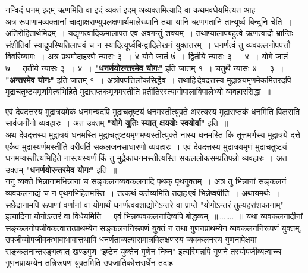 \documentclass[11pt, openany]{book}
\begin{document}
\vspace{-3mm}
 नन्विदं धनम् इदम् ऋणमिति वा इदं व्यक्तं इदम् अव्यक्तमित्यादि 
वा कथमवधेयमित्यत आह\textendash \\

\vspace{-3mm}
 अत्र रूपाणामव्यक्तानां चाद्याक्षराण्युपलक्षणार्थमालेख्यानि तथा यानि 
ऋणगतानि तान्यूर्ध्व बिन्दूनि चेति~। अतिरोहितार्थमिदम्~।
यद्यृणत्वादिकमालापत एव अवगन्तुं शक्यम्~। तथाप्यालापबहुत्वे ऋणत्वादौ भ्रान्तिः 
संशीतिर्वा स्यादुपस्थितिलाघवं च न स्यादित्यूर्ध्वबिन्द्वादिलेखनं
युक्ततरम्~। धनर्णत्वं तु व्यवकलनोपपत्तौ विवरिष्यामः~। अत्र प्रथमोदाहरणे न्यासः 
$\dot{\text{३}}$~। $\dot{\text{४}}$ योगे जातं ७ं~। द्वितीये न्यासः ३~। ४~। योगे जातं ७~। तृतीये न्यासः ३~। $\dot{\text{४}}$~। \hyperref[1.3.1]{\textbf{"धनर्णयोरन्तरमेव योगः"}} इति जातम् $\dot{\text{१}}$~। चतुर्थे न्यासः ४~। $\dot{\text{३}}$~। \hyperref[1.3.1]{\textbf{"अन्तरमेव योगः"}} इति जातम् १~। अत्रोपपत्तिर्लोकसिद्धैव~। तथाहि\textendash \,देवदत्तस्य मुद्रात्रयमृणमेकमितरदपि मुद्राचतुष्टयमृणमित्यभिहिते मुद्रासप्तकमृणमस्तीति प्रतीतिरस्त्यागोपालाविपालेभ्यो व्यवहारसिद्धा~॥
\newpage

 एवं देवदत्तस्य मुद्रात्रयमेकं धनमन्यदपि मुद्राचतुष्टयं धनमस्तीत्युक्ते
अस्त्यस्य मुद्रासप्तकं धनमिति विलसति सार्वजनीनो व्यवहारः~। अत उक्तम् 
\hyperref[1.3.1]{\textbf{"योगे युतिः स्यात् क्षययोः स्वयोर्वा"}} इति~॥\\

\vspace{-3mm}
 अथ देवदत्तस्य मुद्रात्रयं धनमस्ति मुद्राचतुष्टयमृणमप्यस्तीत्युक्ते 
नास्य धनमस्ति किं तूत्तमर्णस्य मुद्रात्रये दत्ते एकैव
मुद्रास्यर्णमस्तीति वरीवर्ति सकलजनसाधारणो व्यवहारः~। एवं देवदत्तस्य मुद्रात्रयमृणं
मुद्राचतुष्टयं धनमप्यस्तीत्यभिहिते नास्त्यस्यर्णं किं तु
मुद्रैकाधनमस्तीत्यस्ति सकललोकसम्प्रतिपन्नो व्यवहारः~। अत उक्तम् \hyperref[1.3.1]{\textbf{"धनर्णयोरन्तरमेव योगः"}} इति~॥ \\

\vspace{-3mm}
 ननु व्यक्ते भिन्नानामभिन्नानां च सङ्कलनव्यवकलनादि पृथक् पृथगुक्तम्~। 
अत्र तु भिन्नानां सङ्कलनं व्यवकलनाद्यं च न पृथगभिहितमस्ति~। 
तत्कथं कर्तव्यमिति तदाह\textendash \,एवं भिन्नेष्वपीति~। अथायमर्थः~।
सछेदानामपि रूपाणां वर्णानां वा योगार्थं धनर्णत्ववशाद्योगेऽन्तरे वा प्राप्ते
{\qt "योगोऽन्तरं तुल्यहरांशकानाम्"} इत्यादिना योगोऽन्तरं वा विधेयमिति~। एवं
भिन्नव्यवकलनादिष्वपि बोद्धव्यम्~॥\ldots.\ldots.~॥ यथा व्यवकलनादीनां सङ्कलनोपजीवकत्वात्तत्प्राथम्येन सङ्कलननिरूपणं युक्तं न तथा गुणनप्राथम्येन
व्यवकलननिरूपणं युक्तम्, उपजीव्योपजीवकभावाभावात्तथापि
धनर्णताव्यत्यासमात्रविलक्षणस्य 
व्यवकलनस्य गुणनापेक्षया सङ्कलनान्तरङ्गत्वात् खण्डगुण {\qt "इष्टेन युक्तेन गुणेन निघ्न"} इत्यस्मिन्नपि गुणने तस्योपजीव्यत्वाच्च गुणनप्राथम्येन
तन्निरूपणं युक्तमिति उपजातिकोत्तरार्धेन तदाह\textendash  
\end{document}
